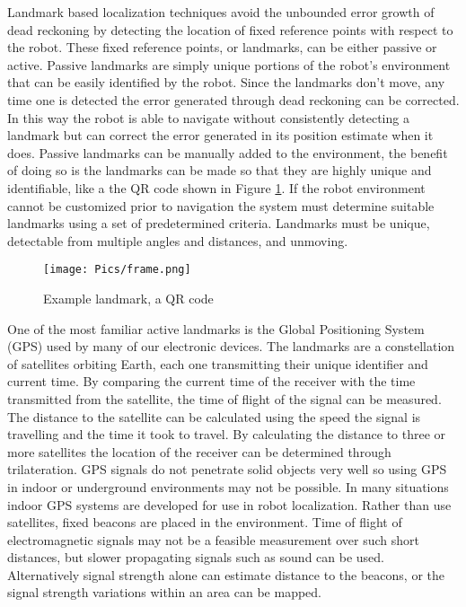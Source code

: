 Landmark based localization techniques avoid the unbounded error growth of dead reckoning by detecting the location of fixed reference points with respect to the robot. These fixed reference points, or landmarks, can be either passive or active. Passive landmarks are simply unique portions of the robot's environment that can be easily identified by the robot. Since the landmarks don't move, any time one is detected the error generated through dead reckoning can be corrected. In this way the robot is able to navigate without consistently detecting a landmark but can correct the error generated in its position estimate when it does. Passive landmarks can be manually added to the environment, the benefit of doing so is the landmarks can be made so that they are highly unique and identifiable, like a the QR code shown in Figure \ref{fig:qr}. If the robot environment cannot be customized prior to navigation the system must determine suitable landmarks using a set of predetermined criteria. Landmarks must be unique, detectable from multiple angles and distances, and unmoving.\\

\begin{figure}
    \centering
    \texttt{[image: Pics/frame.png]}
    \caption{Example landmark, a QR code}
    \label{fig:qr}
\end{figure}

One of the most familiar active landmarks is the Global Positioning System (GPS) used by many of our electronic devices. The landmarks are a constellation of satellites orbiting Earth, each one transmitting their unique identifier and current time. By comparing the current time of the receiver with the time transmitted from the satellite, the time of flight of the signal can be measured. The distance to the satellite can be calculated using the speed the signal is travelling and the time it took to travel. By calculating the distance to three or more satellites the location of the receiver can be determined through trilateration. GPS signals do not penetrate solid objects very well so using GPS in indoor or underground environments may not be possible. In many situations indoor GPS systems are developed for use in robot localization. Rather than use satellites, fixed beacons are placed in the environment. Time of flight of electromagnetic signals may not be a feasible measurement over such short distances, but slower propagating signals such as sound can be used. Alternatively signal strength alone can estimate distance to the beacons, or the signal strength variations within an area can be mapped.\\

